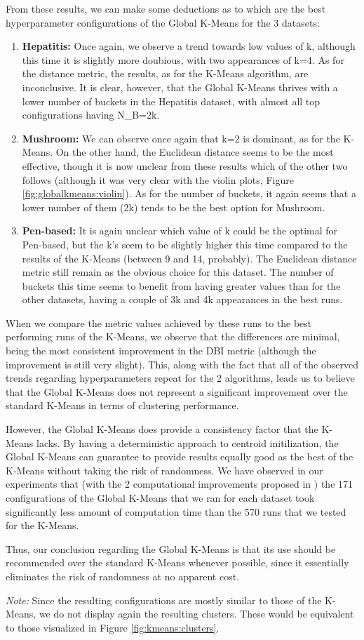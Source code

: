 From these results, we can make some deductions as to which are the best hyperparameter configurations of the Global K-Means for the 3 datasets:
\begin{enumerate}
    \item \textbf{Hepatitis:} Once again, we observe a trend towards low values of k, although this time it is slightly more doubious, with two appearances of k=4. As for the distance metric, the results, as for the K-Means algorithm, are inconclusive. It is clear, however, that the Global K-Means thrives with a lower number of buckets in the Hepatitis dataset, with almost all top configurations having N\_B=2k.
    \item \textbf{Mushroom:} We can observe once again that k=2 is dominant, as for the K-Means. On the other hand, the Euclidean distance seems to be the most effective, though it is now unclear from these results which of the other two follows (although it was very clear with the violin plots, Figure \ref{fig:globalkmeans:violin}). As for the number of buckets, it again seems that a lower number of them (2k) tends to be the best option for Mushroom.
    \item \textbf{Pen-based:} It is again unclear which value of k could be the optimal for Pen-based, but the k's seem to be slightly higher this time compared to the results of the K-Means (between 9 and 14, probably). The Euclidean distance metric still remain as the obvious choice for this dataset.  The number of buckets this time seems to benefit from having greater values than for the other datasets, having a couple of 3k and 4k appearances in the best runs.
\end{enumerate}
When we compare the metric values achieved by these runs to the best performing runs of the K-Means, we observe that the differences are minimal, being the most consistent improvement in the DBI metric (although the improvement is still very slight). This, along with the fact that all of the observed trends regarding hyperparameters repeat for the 2 algorithms, leads us to believe that the Global K-Means does not represent a significant improvement over the standard K-Means in terms of clustering performance.

However, the Global K-Means does provide a consistency factor that the K-Means lacks. By having a deterministic approach to centroid initilization, the Global K-Means can guarantee to provide results equally good as the best of the K-Means without taking the risk of randomness. We have observed in our experiments that (with the 2 computational improvements proposed in \cite{Likas2003}) the 171 configurations of the Global K-Means that we ran for each dataset took significantly less amount of computation time than the 570 runs that we tested for the K-Means.

Thus, our conclusion regarding the Global K-Means is that its use should be recommended over the standard K-Means whenever possible, since it essentially eliminates the risk of randomness at no apparent cost.

\textit{Note:} Since the resulting configurations are mostly similar to those of the K-Means, we do not display again the resulting clusters. These would be equivalent to those visualized in Figure \ref{fig:kmeans:clusters}.
